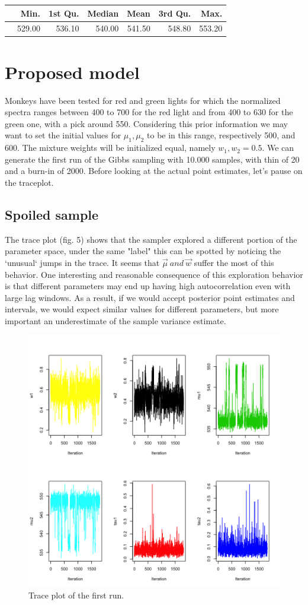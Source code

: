 \documentclass{article}
\begin{document}
\begin{table}[ht]
\centering
\begin{tabular}{rrrrrrr}
  \hline
 & Min. & 1st Qu. & Median & Mean & 3rd Qu. & Max. \\ 
  \hline
 & 529.00 & 536.10 & 540.00 & 541.50 & 548.80 & 553.20 \\ 
   \hline
\end{tabular}
\end{table}


\section{Proposed model}
Monkeys have been tested for red and green lights for which the normalized spectra ranges between 400 to 700 for the red light and from 400 to 630 for the green one, with a pick around 550. Considering this prior information we may want to set the initial values for $\mu_1, \mu_2$ to be in this range, respectively 500, and 600. The mixture weights will be initialized equal, namely $w_1, w_2 = 0.5$.
We can generate the first run of the Gibbs sampling with 10.000 samples, with thin of 20 and a burn-in of 2000. Before looking at the actual point estimates, let's pause on the traceplot.

\subsection{Spoiled sample}
The trace plot (fig. 5) shows that the sampler explored a different portion of the parameter space, under the same "label" this can be spotted by noticing the `unusual` jumps in the trace. It seems that $\vec \mu \ and \  \vec w$ suffer the most of this behavior. One interesting and reasonable consequence of this exploration behavior is that different parameters may end up having high autocorrelation even with large lag windows. As a result, if we would accept posterior point estimates and intervals, we would expect similar values for different parameters, but more important an underestimate of the sample variance estimate. 

\begin{figure}[h!]
    \centering
    \includegraphics[width=.7\textwidth]{plot_6.png}
    \caption{Trace plot of the first run.}
    \label{Monkey measurement}
\end{figure}
\end{document}
